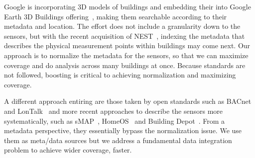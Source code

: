Google is incorporating 3D models of buildings and embedding their into Google 
Earth 3D Buildings offering~\cite{google_3dbuildings}, making them searchable according 
to their metadata and location.
The effort does not include a granularity down to the sensors, but with the recent acquisition
of NEST~\cite{nest}, indexing the metadata that describes the physical measurement points
within buildings may come next.  Our approach is to normalize the metadata for the sensors,
so that we can maximize coverage and do analysis across many buildings at once.  Because standards
are not followed, boosting is critical to achieving normalization and maximizing coverage.

A different approach entiring are those taken by open standards such as BACnet and 
LonTalk~\cite{lontalk,bacnet} and more recent approaches to describe the sensors more
systematically, such as sMAP~\cite{smap}, HomeOS~\cite{homeos} and Building Depot~\cite{BDepot}.  From a metadata perspective, they
essentially bypass the normalization issue.  We use them as meta/data sources but we address a
fundamental data integration problem to achieve wider coverage, faster.
